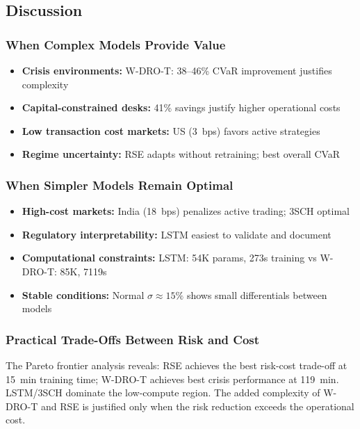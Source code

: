 \subsection{Discussion}

\subsubsection{When Complex Models Provide Value}

\begin{itemize}[noitemsep]
    \item \textbf{Crisis environments:} W-DRO-T: 38--46\% CVaR improvement justifies complexity
    \item \textbf{Capital-constrained desks:} 41\% savings justify higher operational costs
    \item \textbf{Low transaction cost markets:} US (3~bps) favors active strategies
    \item \textbf{Regime uncertainty:} RSE adapts without retraining; best overall CVaR
\end{itemize}

\subsubsection{When Simpler Models Remain Optimal}

\begin{itemize}[noitemsep]
    \item \textbf{High-cost markets:} India (18~bps) penalizes active trading; 3SCH optimal
    \item \textbf{Regulatory interpretability:} LSTM easiest to validate and document
    \item \textbf{Computational constraints:} LSTM: 54K params, 273s training vs W-DRO-T: 85K, 7119s
    \item \textbf{Stable conditions:} Normal $\sigma \approx 15\%$ shows small differentials between models
\end{itemize}

\subsubsection{Practical Trade-Offs Between Risk and Cost}

The Pareto frontier analysis reveals: RSE achieves the best risk-cost trade-off at 15~min training time; W-DRO-T achieves best crisis performance at 119~min. LSTM/3SCH dominate the low-compute region. The added complexity of W-DRO-T and RSE is justified only when the risk reduction exceeds the operational cost.

